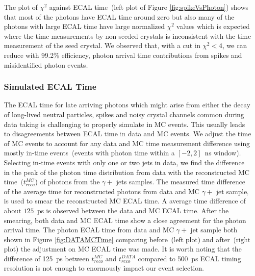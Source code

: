  \vspace{5mm}
The plot of $\chi^{2}$ against ECAL time~(left plot of Figure \ref{fig:spikeVsPhoton}) shows that most of the photons have ECAL time around zero but also many of the photons with large ECAL time  have large normalized $\chi^{2}$ values which is expected where the time measurements by non-seeded crystals is inconsistent with the time measurement of the seed crystal. We observed that, with a cut in $\chi^{2} < 4$, we can reduce with 99.2\% efficiency, photon arrival time contributions from spikes and misidentified photon events.
\subsubsection*{Simulated ECAL Time}
The ECAL time for late arriving photons which might arise from either the decay of long-lived neutral particles, spikes and noisy crystal channels common during data taking is challenging to properly simulate in MC events. This usually leads to disagreements between ECAL time in data and MC events.
We adjust the time of MC events to account for any data and MC time measurement difference using mostly in-time events~(events with photon time within a $[-2, 2 ]$~ns window).
Selecting in-time events with only one or two jets in data, we find the difference in the peak of the photon time distribution from data with the reconstructed MC time~($t^{MC}_{reco}$) of photons from the $\gamma +$ jets samples. The measured time difference of the average time for reconstructed photons from data and MC $\gamma +$ jet sample, is used to smear the reconstructed MC ECAL time. A average time difference of about $125$~ps is observed between the data and MC ECAL time. After the smearing, both data and MC ECAL time show a close agreement for the photon arrival time. The photon ECAL time from data and MC $\gamma +$ jet sample both shown in Figure \ref{fig:DATAMCTime} comparing before~(left plot) and after~(right plot) the adjustment on MC ECAL time was made. 
\newline
 It is worth noting that the difference of 125~ps between $t^{MC}_{reco}$ and $t^{DATA}_{reco}$ compared to 500~ps ECAL timing resolution is not enough to enormously impact our event selection. %

